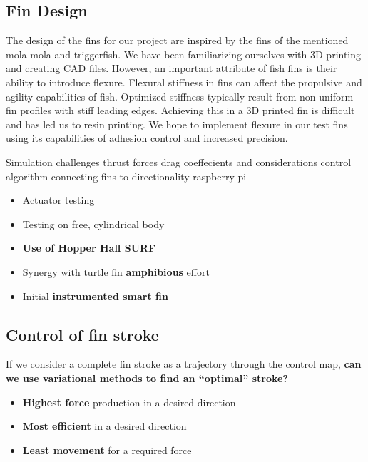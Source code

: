 \documentclass[twocolumn,10pt]{IEEEtran}
\begin{document}
\subsection{Fin Design}
The design of the fins for our project are inspired by the fins of the mentioned mola mola and triggerfish. We have been familiarizing ourselves with 3D printing and creating CAD files. However, an important attribute of fish fins is their ability to introduce flexure. Flexural stiffness in fins can affect the propulsive and agility capabilities of fish. Optimized stiffness typically result from non-uniform fin profiles with stiff leading edges. Achieving this in a 3D printed fin is difficult and has led us to resin printing. We hope to implement flexure in our test fins using its capabilities of adhesion control and increased precision. 



Simulation challenges
 thrust forces
 drag coeffecients and considerations
 control algorithm connecting fins to directionality
 raspberry pi
 
\begin{itemize}
\item Actuator testing
\item Testing on free, cylindrical body
\item \textbf{Use of Hopper Hall SURF} 
\item Synergy with turtle fin \textbf{amphibious} effort
\item Initial \textbf{instrumented smart fin}
\end{itemize}

\subsection{Control of fin stroke}
If we consider a complete fin stroke as a trajectory through the control map, \textbf{can we use variational methods to find an ``optimal'' stroke?}
\begin{itemize}
\item \textbf{Highest force} production in a desired direction
\item \textbf{Most efficient} in a desired direction
\item \textbf{Least movement} for a required force
\end{itemize}
\end{document}
